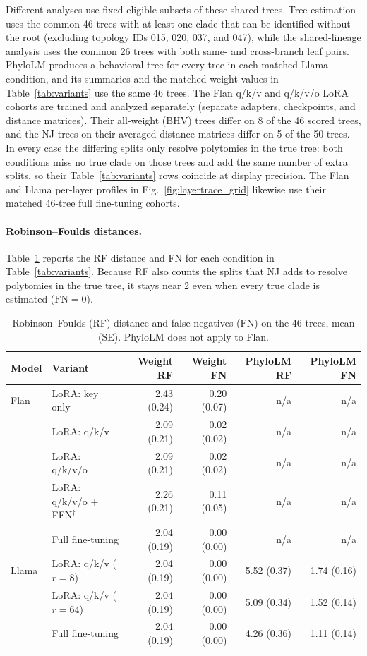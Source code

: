\documentclass{article}
\theoremstyle{definition}
\theoremstyle{plain}
\newif\ifrevision
\newcommand{\rev}[1]{\ifrevision{\color{blue}#1}\else#1\fi}
\newcommand{\revtag}[1]{\ifrevision\textsuperscript{\color{blue}\sffamily\scriptsize[#1]}\fi}
\begin{document}
Different analyses use fixed eligible subsets of these shared trees. Tree estimation uses the
common 46 trees with at least one clade that can be identified without the root (excluding topology IDs 015, 020,
037, and 047), while the shared-lineage analysis uses the common 26 trees with both same- and cross-branch leaf pairs. PhyloLM produces a behavioral tree for every tree in each matched Llama
condition, and its summaries and the matched weight values in
Table~\ref{tab:variants} use the same 46 trees. The Flan q/k/v and q/k/v/o LoRA cohorts are
trained and analyzed separately (separate adapters, checkpoints, and distance matrices). Their
all-weight (BHV) trees differ on 8 of the 46 scored trees, and the NJ trees on their averaged distance
matrices differ on 5 of the 50 trees. In every case the differing splits only resolve polytomies in the true
tree: both conditions miss no true clade on those trees and add the same number of extra splits, so their
Table~\ref{tab:variants} rows coincide at display precision. The Flan and Llama per-layer profiles
in Fig.~\ref{fig:layertrace_grid} likewise use their matched 46-tree full fine-tuning cohorts.

\paragraph{Robinson--Foulds distances.}\label{app:rf}
Table~\ref{tab:rf} reports the RF distance and FN for each condition in Table~\ref{tab:variants}. Because RF also counts the splits that NJ adds to resolve polytomies in the true tree, it stays near 2 even when every true clade is estimated ($\mathrm{FN}=0$).

\begin{table}[h]
\caption{Robinson--Foulds (RF) distance and false negatives (FN) on the 46 trees, mean (SE). PhyloLM does not apply to Flan.}
\label{tab:rf}
\centering
\scriptsize
\begin{tabular}{llrrrr}
\toprule
Model & Variant & Weight RF & Weight FN & PhyloLM RF & PhyloLM FN \\
\midrule
Flan & LoRA: key only\revtag{Corr.}     & \rev{2.43 (0.24)} & \rev{0.20 (0.07)} & n/a & n/a \\
     & LoRA: q/k/v                      & 2.09 (0.21) & 0.02 (0.02) & n/a & n/a \\
     & LoRA: q/k/v/o                    & 2.09 (0.21) & 0.02 (0.02) & n/a & n/a \\
     & LoRA: q/k/v/o + FFN$^\dagger$    & 2.26 (0.21) & 0.11 (0.05) & n/a & n/a \\
     & Full fine-tuning                 & 2.04 (0.19) & 0.00 (0.00) & n/a & n/a \\
\midrule
Llama & LoRA: q/k/v ($r{=}8$)          & 2.04 (0.19) & 0.00 (0.00) & 5.52 (0.37) & 1.74 (0.16) \\
      & LoRA: q/k/v ($r{=}64$)         & 2.04 (0.19) & 0.00 (0.00) & 5.09 (0.34) & 1.52 (0.14) \\
      & Full fine-tuning\revtag{Corr.}  & \rev{2.04 (0.19)} & 0.00 (0.00) & 4.26 (0.36) & 1.11 (0.14) \\
\bottomrule
\end{tabular}
\end{table}
\end{document}
